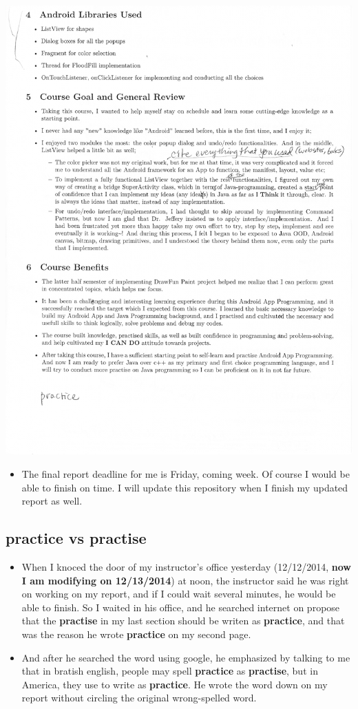 \documentclass[9pt,b5paper]{article}
\begin{document}
\includegraphics[width=.9\linewidth]{./IMG_0002.jpg}
\begin{itemize}
\item The final report deadline for me is Friday, coming week. Of course I would be able to finish on time. I will update this repository when I finish my updated report as well.
\end{itemize}
\subsection{practice vs practise}
\label{sec-7-4}
\begin{itemize}
\item When I knoced the door of my instructor's office yesterday (12/12/2014, \textbf{now I am modifying on 12/13/2014}) at noon, the instructor said he was right on working on my report, and if I could wait several minutes, he would be able to finish. So I waited in his office, and he searched internet on propose that the \textbf{practise} in my last section should be writen as \textbf{practice}, and that was the reason he wrote \textbf{practice} on my second page.
\item And after he searched the word using google, he emphasized by talking to me that in bratish english, people may spell \textbf{practice} as \textbf{practise}, but in America, they use to write as \textbf{practice}. He wrote the word down on my report without circling the original wrong-spelled word.
\end{itemize}
\end{document}
